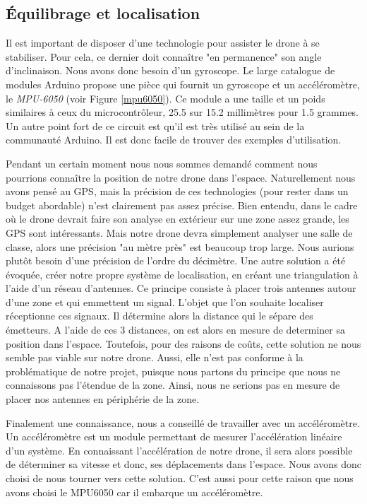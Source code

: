\documentclass[a4paper,10pt]{report}
\begin{document}
      \subsection{Équilibrage et localisation}
	Il est important de disposer d'une technologie pour assister le drone à 
se stabiliser. Pour cela, ce dernier doit connaître "en permanence" son angle 
d'inclinaison. Nous avons donc besoin d'un gyroscope. Le large catalogue de 
modules Arduino propose une pièce qui fournit un gyroscope et un 
accéléromètre, le \textit{MPU-6050} (voir Figure \ref{mpu6050}). Ce module a 
une taille et un poids similaires à ceux du microcontrôleur, 25.5 sur 15.2 
millimètres pour 1.5 grammes. Un autre point fort de ce circuit est qu'il est 
très utilisé au sein de la communauté Arduino. Il est donc facile de trouver 
des exemples d'utilisation.
	
	Pendant un certain moment nous nous sommes demandé comment nous 
pourrions connaître la position de notre drone dans l'espace. Naturellement 
nous avons pensé au GPS, mais la précision de ces technologies (pour rester 
dans 
un budget abordable) n'est clairement pas assez précise. Bien entendu, dans le 
cadre où le drone devrait faire son analyse en extérieur sur une zone assez 
grande, les GPS sont intéressants. Mais notre drone devra simplement analyser 
une salle de classe, alors une précision "au mètre près" est beaucoup trop 
large. Nous aurions plutôt besoin d'une précision de l’ordre du décimètre.  Une 
autre solution a été évoquée, créer notre propre système de localisation, en 
créant une triangulation\cite{triangulation} à l’aide d’un réseau d’antennes. 
Ce principe consiste à placer trois antennes autour d'une zone et qui emmettent 
un signal.
L'objet que l'on souhaite localiser réceptionne ces signaux. Il détermine alors 
la distance
 qui le sépare des émetteurs. A l'aide de ces 3 distances, on  est alors en 
mesure de determiner
 sa position dans l'espace. Toutefois, pour des raisons de coûts, cette solution 
ne nous 
semble pas viable sur notre drone. Aussi, elle n'est pas conforme à la 
problématique de notre projet, puisque nous partons du principe que nous ne 
connaissons pas l'étendue de la zone. Ainsi, nous ne serions pas en mesure de 
placer nos antennes en périphérie de la zone.


	Finalement une connaissance, nous a conseillé de travailler avec un 
accéléromètre. Un accéléromètre est un module permettant de mesurer 
l'accélération linéaire d’un système. En connaissant l'accélération de notre 
drone, il sera alors possible de déterminer sa vitesse et donc, ses 
déplacements 
dans l’espace. Nous avons donc choisi de nous tourner vers cette solution. 
C'est aussi pour cette raison que nous avons choisi le MPU6050 car il embarque 
un accéléromètre.
	
\end{document}

